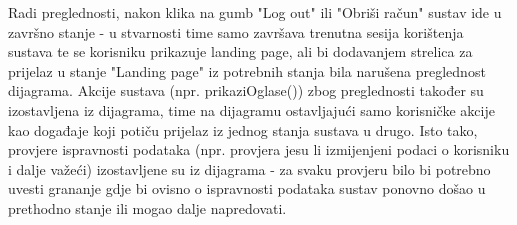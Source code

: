                  Radi preglednosti, nakon klika na gumb "Log out" ili "Obriši račun" sustav ide u završno stanje - u stvarnosti time samo završava trenutna sesija korištenja sustava te se korisniku prikazuje landing page, ali bi dodavanjem strelica za prijelaz u stanje "Landing page" iz potrebnih stanja bila narušena preglednost dijagrama. Akcije sustava (npr. prikaziOglase()) zbog preglednosti također su izostavljena iz dijagrama, time na dijagramu ostavljajući samo korisničke akcije kao događaje koji potiču prijelaz iz jednog stanja sustava u drugo. Isto tako, provjere ispravnosti podataka (npr. provjera jesu li izmijenjeni podaci o korisniku i dalje važeći) izostavljene su iz dijagrama - za svaku provjeru bilo bi potrebno uvesti grananje gdje bi ovisno o ispravnosti podataka sustav ponovno došao u prethodno stanje ili mogao dalje napredovati. 

                \eject
		
			
			
			
		
		
